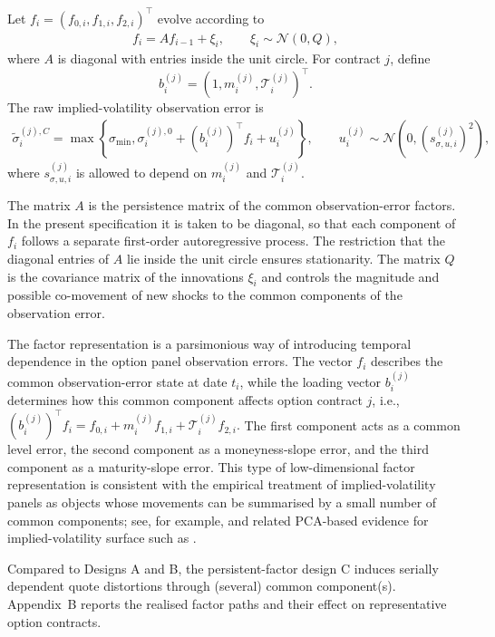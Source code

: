 \documentclass[11pt,a4paper,notitlepage]{article}
\numberwithin{equation}{section}
\begin{document}
Let
$f_i=(f_{0,i},f_{1,i},f_{2,i})^\top$ evolve according to
\begin{align}
f_i=A f_{i-1}+\xi_i,
\qquad
\xi_i\sim\mathcal{N}(0,Q),
\label{eq:factor_noise}
\end{align}
where $A$ is diagonal with entries inside the unit circle. For contract $j$, define
\[
b_i^{(j)}
=
\left(1,m_i^{(j)},\mathcal T_i^{(j)}\right)^\top.
\]
The raw implied-volatility observation error is
\begin{align}
\tilde\sigma_i^{(j),C}
=
\max\left\{
\sigma_{\min},
\sigma_i^{(j),0}
+
\left(b_i^{(j)}\right)^\top f_i
+
u_i^{(j)}
\right\},
\qquad
u_i^{(j)}\sim\mathcal{N}\left(0,\left(s_{\sigma,u,i}^{(j)}\right)^2\right),
\label{eq:factor_iv_noise}
\end{align}
where $s_{\sigma,u,i}^{(j)}$ is allowed to depend on $m_i^{(j)}$ and $\mathcal T_i^{(j)}$. 

The matrix $A$ is the persistence matrix of the common observation-error factors. In the present specification it is taken to be diagonal, so that each component of $f_i$ follows a separate first-order autoregressive process. The restriction that the diagonal entries of $A$ lie inside the unit circle ensures stationarity. The matrix $Q$ is the covariance matrix of the innovations $\xi_i$ and controls the magnitude and possible co-movement of new shocks to the common components of the observation error.

The factor representation is a parsimonious way of introducing temporal dependence in the option panel observation errors. The vector $f_i$ describes the common observation-error state at date $t_i$, while the loading vector $b_i^{(j)}$ determines how this common component affects option contract $j$, i.e., $\left(b_i^{(j)}\right)^\top f_i = f_{0,i}+m_i^{(j)}f_{1,i}+\mathcal T_i^{(j)}f_{2,i}.$
The first component acts as a common level error, the second component as a moneyness-slope error, and the third component as a maturity-slope error. This type of low-dimensional factor representation is consistent with the empirical treatment of implied-volatility panels as objects whose movements can be summarised by a small number of common components; see, for example, \cite{cont2002dynamics} and related PCA-based evidence for implied-volatility surface such as  \cite{avellaneda2020pca}.

Compared to Designs A and B, the persistent-factor design C induces serially dependent quote distortions through (several) common component(s). Appendix~B reports the realised factor paths and their effect on representative option contracts.
\end{document}
